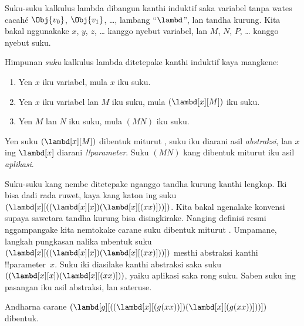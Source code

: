 \documentclass[../../../include/open-logic-section]{subfiles}
\begin{document}

Suku-suku kalkulus lambda dibangun kanthi
induktif saka variabel tanpa wates cacahé
$\Obj{v_0}$, $\Obj{v_1}$, \dots, lambang
``$\lambd$'', lan tandha kurung. Kita bakal
nggunakake $x$, $y$, $z$, \dots{} kanggo
nyebut variabel, lan $M$, $N$, $P$, \dots{}
kanggo nyebut suku.

\begin{defn}[Suku] 
Himpunan \emph{suku} kalkulus lambda
ditetepake kanthi induktif kaya mangkene:
\begin{enumerate}
  \item {} Yen $x$ iku
    variabel, mula $x$ iku suku.
  \item {} Yen $x$ iku
    variabel lan $M$ iku suku, mula
    $(\lambd[x][M])$ iku suku.
  \item {} Yen $M$
    lan $N$ iku suku, mula $(MN)$ iku suku.
\end{enumerate}
\end{defn}

Yen suku $(\lambd[x][M])$ dibentuk miturut
, suku iku diarani
asil \emph{abstraksi}, lan $x$ ing
$\lambd[x]$ diarani \emph{!!{parameter}}.
Suku $(MN)$ kang dibentuk miturut
 iku asil
\emph{aplikasi}.

Suku-suku kang nembe ditetepake nganggo
tandha kurung kanthi lengkap. Iki bisa
dadi rada ruwet, kaya kang katon ing
suku $(\lambd[x][((\lambd[x][x])(\lambd[x][(xx)]))])$.
Kita bakal ngenalake konvensi supaya
sawetara tandha kurung bisa disingkirake.
Nanging definisi resmi nggampangake kita
nemtokake carane suku dibentuk miturut
. Umpamane, langkah
pungkasan nalika mbentuk suku
$(\lambd[x][((\lambd[x][x])(\lambd[x][(xx)]))])$
mesthi abstraksi kanthi !!{parameter}~$x$.
Suku iki diasilake kanthi abstraksi saka
suku $((\lambd[x][x])(\lambd[x][(xx)]))$,
yaiku aplikasi saka rong suku. Saben
suku ing pasangan iku asil abstraksi,
lan sateruse.

\begin{prob}
%
Andharna carane
$(\lambd[g][((\lambd[x][(g (x x))])
  (\lambd[x][(g (x x))]))])$ dibentuk.
\end{prob}
\end{document}
